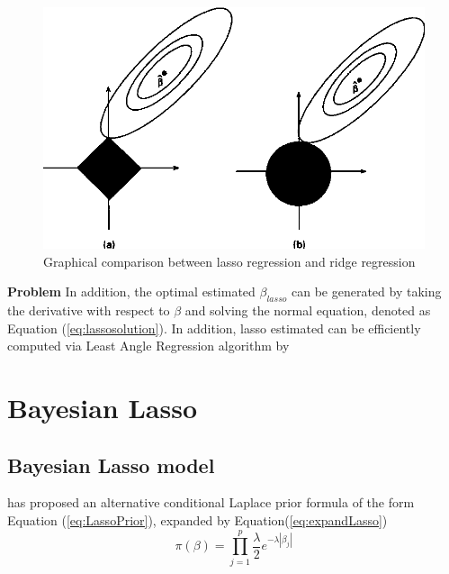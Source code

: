 \begin{figure}
	\includegraphics[width=\linewidth]{lassodemo}
	\caption{Graphical comparison between lasso regression and ridge regression}
	\label{fig:lassodemo}
\end{figure}

\textbf{Problem}
In addition, the optimal estimated $\beta_{lasso}$ can be generated by taking the derivative with respect to $\beta$ and solving the normal equation, denoted as Equation (\ref{eq:lassosolution}).
In addition, lasso estimated can be efficiently computed via Least Angle Regression algorithm by


\section{Bayesian Lasso}
\subsection{Bayesian Lasso model}
\cite{park_casella_2008} has proposed an alternative conditional Laplace prior formula of the form Equation (\ref{eq:LassoPrior}), expanded by Equation(\ref{eq:expandLasso})
\begin{equation}
	\label{eq:expandLasso}
	\pi(\beta) = \prod_{j=1}^p \frac{\lambda}{2} e^{-\lambda|\beta_j|}
\end{equation}

